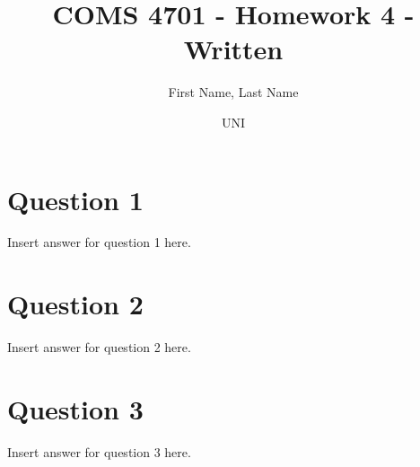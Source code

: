 \documentclass{article}
\title{COMS 4701 - Homework 4 - Written}
\author
{
First Name, Last Name
\and UNI
}
\begin{document}
    \maketitle

    \section*{Question 1}
    Insert answer for question 1 here.
    \newpage
    \section*{Question 2}
    Insert answer for question 2 here.
    \newpage
    \section*{Question 3}
    Insert answer for question 3 here.
\end{document}
